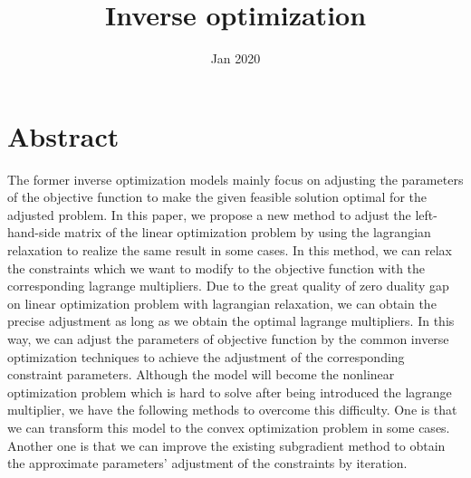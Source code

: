 \documentclass[UTF8]{article}
\title{Inverse optimization}
\date{Jan 2020}
\numberwithin{equation}{section}
\begin{document}
\maketitle{}

\section{Abstract}
\quad The former inverse optimization models mainly focus on adjusting the parameters of the objective function to make the given feasible solution optimal for the adjusted problem. In this paper, we propose a new method to adjust the left-hand-side matrix of the linear optimization problem by using the lagrangian relaxation to realize the same result in some cases. In this method, we can relax the constraints which we want to modify to the objective function with the corresponding lagrange multipliers. Due to the great quality of zero duality gap on linear optimization problem with lagrangian relaxation, we can obtain the precise adjustment as long as we obtain the optimal lagrange multipliers. In this way, we can adjust the parameters of objective function by the common inverse optimization techniques to achieve the adjustment of the corresponding constraint parameters. Although the model will become the nonlinear optimization problem which is hard to solve after being introduced the lagrange multiplier, we have the following methods to overcome this difficulty. One is that we can transform this model to the convex optimization problem in some cases. Another one is that we can improve the existing subgradient method to obtain the approximate parameters' adjustment of the constraints by iteration.
\end{document}
